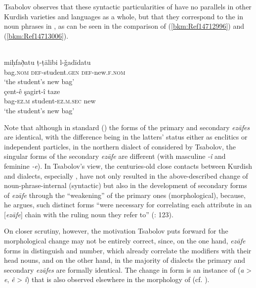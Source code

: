 \documentclass[output=paper]{langsci/langscibook}
\begin{document}
Tsabolov observes that these syntactic particularities of  have no parallels in other Kurdish varieties and  languages as a whole, but that they correspond to the  in noun phrases in , as can be seen in the comparison of (\ref{bkm:Ref14712996}) and (\ref{bkm:Ref14713006}). 

\ea\label{bkm:Ref14712996}\label{bkm:Ref14771925} \citep[123]{Tsabolov1994}\\
\gll miḥfað̣atu ṭ-ṭālibi l-ǧadīdatu\\
     bag\textsc{.nom} \textsc{def}{}-student.\textsc{gen} \textsc{def}{}-new.\textsc{f.nom} \\
\glt ‘the student’s new bag’
\ex \label{bkm:Ref14713006} \citep[123]{Tsabolov1994}\\
\gll çent-ê şagirt-î taze\\
     bag-\textsc{ez.m} student-\textsc{ez.m.sec} new\\
\glt ‘the student’s new bag’
\z

Note that although in standard  () the forms of the primary and secondary \textit{ezāfes} are identical, with the difference being in the latters’ status either as enclitics or independent particles, in the northern dialect of  considered by Tsabolov, the singular forms of the secondary \textit{ezāfe} are different (with masculine \textit{{}-î} and feminine \textit{{}-e}). In Tsabolov’s view, the centuries-old close contacts between Kurdish and  dialects, especially , have not only resulted in the above-described change of noun-phrase-internal  (syntactic) but also in the development of secondary forms of \textit{ezāfe} through the “weakening” of the primary ones (morphological), because, he argues, such distinct forms “were necessary for correlating each attribute in an [\textit{ezāfe}] chain with the ruling noun they refer to” (\citeyear{Tsabolov1994}: 123). 

On closer scrutiny, however, the motivation Tsabolov puts forward for the morphological change may not be entirely correct, since, on the one hand, \textit{ezāfe} forms in  distinguish  and number, which already correlate the modifiers with their head nouns, and on the other hand, in the majority of  dialects the primary and secondary \textit{ezāfes} are formally identical. The change in form is an instance of  (\textit{a} > \textit{e}, \textit{ê} > \textit{î}) that is also observed elsewhere in the morphology of  (cf. \citealt{HaigÖpengin2018}). 
\end{document}
